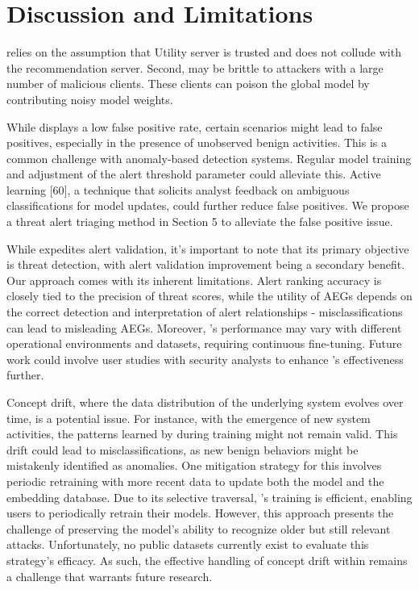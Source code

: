 \section{Discussion and Limitations}
\label{sec:discussion}

 \Sys relies on the assumption that Utility server is trusted and does not collude with the recommendation server. Second, \Sys may be brittle to attackers with a large number of malicious clients. These clients can poison the global model by contributing noisy model weights.

 While \Sys displays a low false positive rate, certain scenarios might lead to false positives, especially in the presence of unobserved benign activities. This is a common challenge with anomaly-based detection systems. Regular model training and adjustment of the alert threshold parameter could alleviate this. Active learning [60], a technique that solicits analyst feedback on ambiguous classifications for model updates, could further reduce false positives. We propose a threat alert triaging method in Section 5 to alleviate the false positive issue. 

 While \Sys expedites alert validation, it’s important to note that its primary objective is threat detection, with alert validation improvement being a secondary benefit. Our approach comes with its inherent limitations. Alert ranking accuracy is closely tied to the precision of threat scores, while the utility of AEGs depends on the correct detection and interpretation of alert relationships - misclassifications can lead to misleading AEGs. Moreover, \Sys’s performance may vary with different operational environments and datasets, requiring continuous fine-tuning. Future work could involve user studies with security analysts to enhance \Sys’s effectiveness further.

 Concept drift, where the data distribution of the underlying system evolves over time, is a potential issue. For instance, with the emergence of new system activities, the patterns learned by \Sys during training might not remain valid. This drift could lead to misclassifications, as new benign behaviors might be mistakenly identified as anomalies. One mitigation strategy for this involves periodic retraining with more recent data to update both the model and the embedding database. Due to its selective traversal, \Sys’s training is efficient, enabling users to periodically retrain their models. However, this approach presents the challenge of preserving the model’s ability to recognize older but still relevant attacks. Unfortunately, no public datasets currently exist to evaluate this strategy’s efficacy. As such, the effective handling of concept drift within \Sys remains a challenge that warrants future research. 